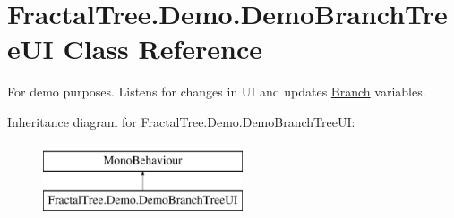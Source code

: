 \hypertarget{class_fractal_tree_1_1_demo_1_1_demo_branch_tree_u_i}{}\section{Fractal\+Tree.\+Demo.\+Demo\+Branch\+Tree\+UI Class Reference}
\label{class_fractal_tree_1_1_demo_1_1_demo_branch_tree_u_i}


For demo purposes. Listens for changes in UI and updates \hyperlink{interface_fractal_tree_1_1_branch}{Branch} variables.  


Inheritance diagram for Fractal\+Tree.\+Demo.\+Demo\+Branch\+Tree\+UI\+:\begin{figure}[H]
\begin{center}
\leavevmode
\includegraphics[height=2.000000cm]{class_fractal_tree_1_1_demo_1_1_demo_branch_tree_u_i}
\end{center}
\end{figure}
